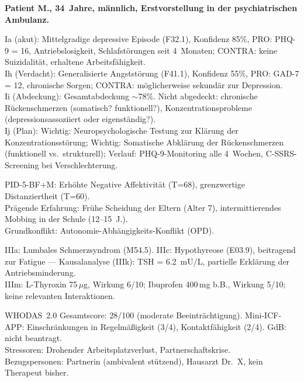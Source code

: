 \documentclass[11pt,a4paper]{article}
\begin{document}
\vspace{0.5em}
\noindent \textbf{Patient M., 34~Jahre, m\"annlich, Erstvorstellung in der psychiatrischen Ambulanz.}

\begin{description}[style=nextline, leftmargin=1.5cm, font=\bfseries\small]
\item[Achse~I (Psychische Profile)]
Ia (akut): Mittelgradige depressive Episode (F32.1), Konfidenz 85\%, PRO: PHQ-9 = 16, Antriebslosigkeit, Schlafst\"orungen seit 4~Monaten; CONTRA: keine Suizidalit\"at, erhaltene Arbeitsf\"ahigkeit. \\
Ih (Verdacht): Generalisierte Angstst\"orung (F41.1), Konfidenz 55\%, PRO: GAD-7 = 12, chronische Sorgen; CONTRA: m\"oglicherweise sekund\"ar zur Depression. \\
Ii (Abdeckung): Gesamtabdeckung $\sim$78\%. Nicht abgedeckt: chronische R\"uckenschmerzen (somatisch? funktionell?), Konzentrationsprobleme (depressionsassoziiert oder eigenst\"andig?). \\
Ij (Plan): Wichtig: Neuropsychologische Testung zur Kl\"arung der Konzentrationsst\"orung; Wichtig: Somatische Abkl\"arung der R\"uckenschmerzen (funktionell vs.\ strukturell); Verlauf: PHQ-9-Monitoring alle 4~Wochen, C-SSRS-Screening bei Verschlechterung.
\item[Achse~II (Biographie)]
PID-5-BF+M: Erh\"ohte Negative Affektivit\"at (T=68), grenzwertige Distanziertheit (T=60). \\
Pr\"agende Erfahrung: Fr\"uhe Scheidung der Eltern (Alter 7), intermittierendes Mobbing in der Schule (12--15~J.). \\
Grundkonflikt: Autonomie-Abh\"angigkeits-Konflikt (OPD).
\item[Achse~III (Med. Synopse)]
IIIa: Lumbales Schmerzsyndrom (M54.5). IIIc: Hypothyreose (E03.9), beitragend zur Fatigue --- Kausalanalyse (IIIk): TSH = 6.2~mU/L, partielle Erkl\"arung der Antriebsminderung. \\
IIIm: L-Thyroxin 75\,$\mu$g, Wirkung 6/10; Ibuprofen 400\,mg b.B., Wirkung 5/10; keine relevanten Interaktionen.
\item[Achse~IV (Umwelt \& Funktion)]
WHODAS~2.0 Gesamtscore: 28/100 (moderate Beeintr\"achtigung). Mini-ICF-APP: Einschr\"ankungen in Regelm\"a\ss{}igkeit (3/4), Kontaktf\"ahigkeit (2/4). GdB: nicht beantragt. \\
Stressoren: Drohender Arbeitsplatzverlust, Partnerschaftskrise. \\
Bezugspersonen: Partnerin (ambivalent st\"utzend), Hausarzt Dr.~X, kein Therapeut bisher.

\end{description}
\end{document}

